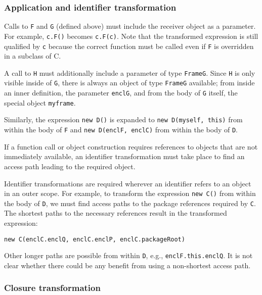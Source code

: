 \documentclass[letterpaper,11pt]{article}
\newcommand{\code}[1]{\lstinline$#1$}
\begin{document}
\subsubsection{Application and identifier transformation}

Calls to \code{F} and \code{G} (defined above) must include the receiver object as a parameter.
For example, \code{c.F()} becomes \code{c.F(c)}.
Note that the transformed expression is still qualified by \code{c}
because the correct function must be called even if \code{F} is overridden in a subclass of C.

A call to \code{H} must additionally include a parameter of type \code{FrameG}.
Since \code{H} is only visible inside of \code{G}, there is always an object of
type \code{FrameG} available;
from inside an inner definition, the parameter \code{enclG}, and from
the body of \code{G} itself, the special object \code{myframe}.

Similarly, the expression \code{new D()} is expanded to \code{new D(myself, this)}
from within the body of \code{F} and \code{new D(enclF, enclC)}
from within the body of \code{D}.

If a function call or object construction requires references to objects
that are not immediately available, an identifier transformation must take place to
find an access path leading to the required object.

Identifier transformations are required wherever an identifier refers to an object
in an outer scope.
For example, to transform the expression \code{new C()} from within the body of
\code{D}, we must find access paths to the package references required by \code{C}.
The shortest paths to the necessary references result in the transformed
expression:
\begin{lstlisting}
new C(enclC.enclQ, enclC.enclP, enclC.packageRoot)
\end{lstlisting}
Other longer paths are possible from within \code{D}, e.g., \code{enclF.this.enclQ}.
It is not clear whether there could be any benefit from using a non-shortest access path.

\subsubsection{Closure transformation}
\end{document}
